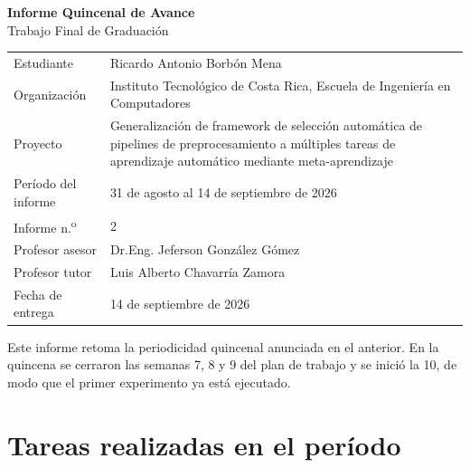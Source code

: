 \documentclass[11pt,letterpaper]{article}
\begin{document}
\vspace*{0.12\textheight}
\begin{center}
{\LARGE\bfseries\color{tecnavy} Informe Quincenal de Avance}\\[4pt]
{\large Trabajo Final de Graduación}\\[10pt]
\end{center}

\vspace{10pt}
\begin{center}
\begin{tabularx}{0.92\textwidth}{L{3.6cm} Y}
\toprule
{}  \\
\midrule
Estudiante & Ricardo Antonio Borbón Mena \\
Organización & Instituto Tecnológico de Costa Rica, Escuela de Ingeniería
en Computadores \\
Proyecto & Generalización de framework de selección automática de pipelines de
preprocesamiento a múltiples tareas de aprendizaje automático mediante
meta-aprendizaje \\
Período del informe & 31 de agosto al 14 de septiembre de 2026 \\
Informe n.\textsuperscript{o} & 2 \\
Profesor asesor & Dr.Eng. Jeferson González Gómez \\
Profesor tutor & Luis Alberto Chavarría Zamora \\
Fecha de entrega & 14 de septiembre de 2026 \\
\bottomrule
\end{tabularx}
\end{center}

\vspace{20pt}
\begin{center}
\begin{minipage}{0.86\textwidth}
\centering
{\small\color{gris} Este informe retoma la periodicidad quincenal anunciada en el
anterior. En la quincena se cerraron las semanas 7, 8 y 9 del plan de trabajo y se
inició la 10, de modo que el primer experimento ya está ejecutado.}
\end{minipage}
\end{center}

\newpage
\section{Tareas realizadas en el período}
\end{document}
